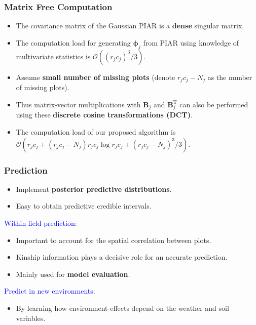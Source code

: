 \documentclass{beamer}
\newcommand{\bB}{\mathbf{B}}
\newcommand{\bphi}{{\bm\phi}}
\newcommand{\sT}{\mathrm{T}}
\begin{document}
\begin{frame}
	\frametitle{Matrix Free Computation}
	
	\begin{itemize}
	\item  The covariance matrix of the Gaussian PIAR is a \textbf{dense} singular matrix.
	\item The computation load for generating $\bphi_j$ from PIAR using knowledge of multivariate statistics is ${\mathcal O}((r_jc_j)^3/3)$.
	\item Assume \textbf{small number of missing plots} (denote $r_j c_j-N_j$ as the number of missing plots).
	\item Thus matrix-vector multiplications with $\bB_j$ and $\bB^{\sT}_j$ can also be performed using these \textbf{discrete cosine transformations (DCT)}.
	\item The computation load of our proposed algorithm is $\mathcal{O}( r_jc_j + (r_j c_j-N_j) r_j c_j \log r_jc_j +  (r_j c_j-N_j)^3/3)$.	\end{itemize}
	
\end{frame}





\begin{frame}
	\frametitle{Prediction}
	
	\begin{itemize}
	\item Implement \textbf{posterior predictive distributions}.
	\item Easy to obtain predictive credible intervals.
	\end{itemize}
	\pause
	\textcolor{blue}{Within-field prediction}:
	\begin{itemize}
	\item Important to account for the spatial correlation between plots.
	\item Kinship information plays a decisive role for an accurate prediction.
	\item Mainly used for \textbf{model evaluation}.
	\end{itemize}
	\pause
	\textcolor{blue}{Predict in new environments}:
	\begin{itemize}
	\item By learning how environment effects depend on the weather and soil variables.
	\end{itemize}
	
\end{frame}
\end{document}
